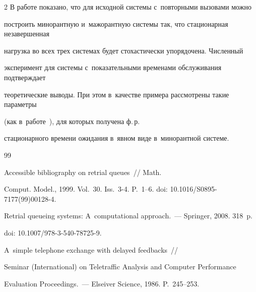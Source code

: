 \begin{multicols}{2}
В работе показано, что для исходной системы с~повторными вызовами можно 


построить минорантную и~мажорантную системы так, что стационарная незавершенная 


нагрузка во всех трех сис\-те\-мах будет стохастически упорядочена. Численный 


эксперимент для сис\-те\-мы с~показательными временами обслуживания подтверждает 


теоретические выводы. При этом в~качестве примера рас\-смот\-ре\-ны такие па\-ра\-мет\-ры 


(как в~работе~\cite{rego}), для которых получена ф.\,р.\ 


стационарного времени ожидания в~явном виде в~минорантной сис\-теме.








{\small\frenchspacing


 { %




 \begin{thebibliography}{99}







 {Accessible bibliography on retrial queues}~// Math. 


Comput. Model., 1999. Vol.~30. Iss.~3-4. P.~1--6. doi: 10.1016/S0895-7177(99)00128-4.












{Retrial queueing systems: A~computational approach}.~---   Springer, 2008. 318~p.


doi: 10.1007/978-3-540-78725-9.












A~simple telephone exchange with delayed feedbacks~// 


Seminar (International) on Teletraffic Analysis and Computer Performance 


Evaluation Proceedings.~--- Elseiver Science, 1986. P.~245--253.






\end{thebibliography}}}
\end{multicols}
